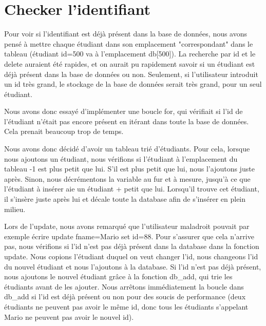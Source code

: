 \documentclass[utf8]{article}
\begin{document}
\section{Checker l'identifiant}
\indent{}
\par
Pour voir si l'identifiant est déjà présent dans la base de données, nous avons pensé à mettre chaque étudiant
dans son emplacement "correspondant" dans le tableau (étudiant id=500 va à l'emplacement db[500]). La recherche par id et le delete auraient été rapides, et on 
aurait pu rapidement savoir si un étudiant est déjà présent dans la base de données ou non.
Seulement, si l'utilisateur introduit un id très grand, le stockage de la base de données serait très grand, pour un seul étudiant.
\par
\indent{}
\par
Nous avons donc essayé d'implémenter une boucle for, qui vérifiait si l'id de l'étudiant n'était pas encore présent en itérant dans toute la base de données.
Cela prenait beaucoup trop de temps. 
\par
\indent{}
\par
Nous avons donc décidé d'avoir un tableau trié d'étudiants. Pour cela, lorsque nous ajoutons un étudiant,
nous vérifions si l'étudiant à l'emplacement du tableau -1 est plus petit que lui. S'il est plus petit que lui, nous l'ajoutons juste après. Sinon, 
nous décrémentons la variable au fur et à mesure, jusqu'à ce que l'étudiant à insérer aie un étudiant + petit que lui. Lorsqu'il trouve cet étudiant, il s'insère juste après lui
et décale toute la database afin de s'insérer en plein milieu.
\par
\indent{}
\par
Lors de l'update, nous avons remarqué que l'utilisateur maladroit pouvait par exemple écrire update fname=Mario set id=88.
Pour s'assurer que cela n'arrive pas, nous vérifions si l'id n'est pas déjà présent dans la database dans la fonction update.
Nous copions l'étudiant duquel on veut changer l'id, nous changeons l'id du nouvel étudiant et nous l'ajoutons à la database. Si l'id 
n'est pas déjà présent, nous ajoutons le nouvel étudiant grâce à la fonction db\_add, qui trie les étudiants avant de les ajouter.
Nous arrêtons immédiatement la boucle dans db\_add si l'id est déjà présent ou non pour des soucis de performance (deux étudiants ne peuvent pas avoir le même id, 
donc tous les étudiants s'appelant Mario ne peuvent pas avoir le nouvel id). 
\par
\end{document}
